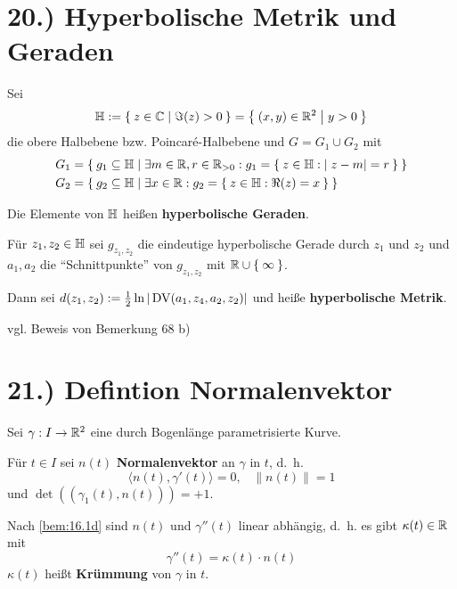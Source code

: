 \documentclass[a5paper,oneside]{scrbook}
\begin{document}
\section*{20.) Hyperbolische Metrik und Geraden}
\begin{definition}%
    Sei
        \[\mathbb{H}:= \Set{z \in \ensuremath{\mathbb{C}}| \Im(z) > 0} = \Set{(x,y) \in \ensuremath{\mathbb{R}}^2 | y > 0}\]
    die obere Halbebene bzw. Poincaré-Halbebene und $G = G_1 \cup G_2$
    mit
        \begin{align*}
            G_1 &= \Set{g_1 \subseteq \ensuremath{\mathbb{H}}| \exists m \in \ensuremath{\mathbb{R}}, r \in \ensuremath{\mathbb{R}}_{>0}: g_1 = \Set{z \in \ensuremath{\mathbb{H}}: |z-m|=r}}\\
            G_2 &= \Set{g_2 \subseteq \ensuremath{\mathbb{H}}| \exists x \in \ensuremath{\mathbb{R}}: g_2 = \Set{z \in \ensuremath{\mathbb{H}}: \Re(z) = x}}
        \end{align*}

    Die Elemente von $\mathbb{H}$ heißen \textbf{hyperbolische Geraden}.
\end{definition}
\begin{definition}%
    Für $z_1, z_2 \in \mathbb{H}$ sei $g_{z_1, z_2}$ die eindeutige hyperbolische
    Gerade durch $z_1$ und $z_2$ und $a_1, a_2$ die
    \enquote{Schnittpunkte} von $g_{z_1, z_2}$ mit $\mathbb{R} \cup \Set{\infty}$.

    Dann sei $d(z_1, z_2) := \frac{1}{2} \ln |\operatorname{DV}(a_1, z_4, a_2, z_2) |$
    und heiße \textbf{hyperbolische Metrik}.
\end{definition}

vgl. Beweis von Bemerkung 68 b)

\section*{21.) Defintion Normalenvektor}
\begin{definition}%
    Sei $\gamma: I \rightarrow \mathbb{R}^2$ eine durch Bogenlänge
    parametrisierte Kurve.

    \begin{defenum}
        \item Für $t \in I$ sei $n(t)$ \textbf{Normalenvektor}
              an $\gamma$ in $t$, d.~h.
              \[\langle n(t), \gamma'(t) \rangle = 0, \;\;\; \|n(t)\|=1 \]
              und $\det((\gamma_1(t), n(t))) = +1$.
        \item Nach \cref{bem:16.1d} sind $n(t)$ und $\gamma''(t)$ linear
              abhängig, d.~h. es gibt $\kappa(t) \in \mathbb{R}$ mit
              \[\gamma''(t) = \kappa(t) \cdot n(t)\]
              $\kappa(t)$ heißt \textbf{Krümmung}
              von $\gamma$ in $t$.
    \end{defenum}
\end{definition}
\end{document}
